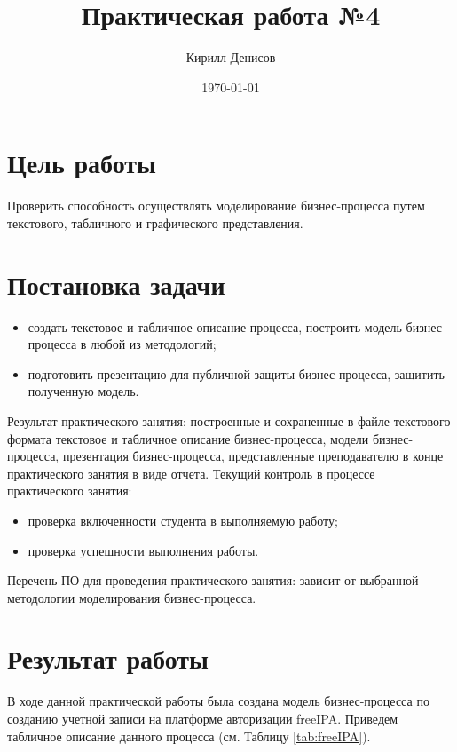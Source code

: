 \documentclass[a4paper,14pt]{extarticle}
\author{Кирилл Денисов}
\title{Практическая работа №4}
\date{\today}
\newcommand{\pathToCommonFolder}{/home/denilai/Documents/repos/latex/Common}
\begin{document}
	\thispagestyle{empty}
	
	\newpage
	\newpage

\section*{Цель работы}
Проверить способность осуществлять моделирование бизнес-процесса путем текстового, табличного и графического представления.
\section*{Постановка задачи}
\begin{itemize}
	\item создать текстовое и табличное описание процесса, построить модель бизнес-процесса в любой из методологий;
	\item  подготовить презентацию для публичной защиты бизнес-процесса, защитить полученную модель.


\end{itemize}

Результат практического занятия: построенные и сохраненные в файле текстового формата текстовое и табличное описание бизнес-процесса, модели бизнес-процесса, презентация бизнес-процесса, представленные преподавателю в конце практического занятия в виде отчета.
Текущий контроль в процессе практического занятия: 
\begin{itemize}
	\item проверка включенности студента в выполняемую работу; 
	\item проверка успешности выполнения работы. 
\end{itemize}

Перечень ПО для проведения практического занятия: зависит от выбранной методологии моделирования бизнес-процесса.
\section*{Результат работы}

В ходе данной практической работы была создана модель бизнес-процесса по созданию учетной записи на платформе авторизации freeIPA. Приведем табличное описание данного процесса (см. Таблицу \ref{tab:freeIPA}).
\end{document}
